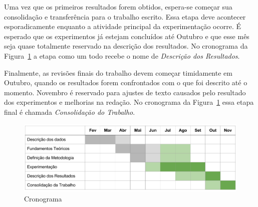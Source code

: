 \documentclass[12pt,a4paper,final]{article}
\begin{document}
Uma vez que os primeiros resultados forem obtidos, espera-se começar sua consolidação e transferência para o trabalho escrito. Essa etapa deve acontecer esporadicamente enquanto a atividade principal da experimentação ocorre. É esperado que os experimentos já estejam concluídos até Outubro e que esse mês seja quase totalmente reservado na descrição dos resultados. No cronograma da Figura~\ref{fig:cronograma} a etapa como um todo recebe o nome de \textit{Descrição dos Resultados}.

Finalmente, as revisões finais do trabalho devem começar timidamente em Outubro, quando os resultados forem confrontados com o que foi descrito até o momento. Novembro é reservado para ajustes de texto causados pelo resultado dos experimentos e melhorias na redação. No cronograma da Figura~\ref{fig:cronograma} essa etapa final é chamada \textit{Consolidação do Trabalho}.

\begin{figure}[htb]
    \centering
    \includegraphics[scale=0.4]{dissertacao-cronograma.png}
    \caption{Cronograma}
    \label{fig:cronograma}
\end{figure}
\end{document}
